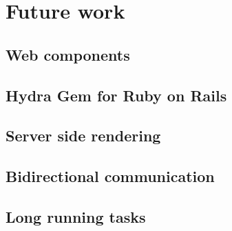 \section{Future work}

\subsection{Web components}
\subsection{Hydra Gem for Ruby on Rails}
\subsection{Server side rendering}
\subsection{Bidirectional communication}
\subsection{Long running tasks}
